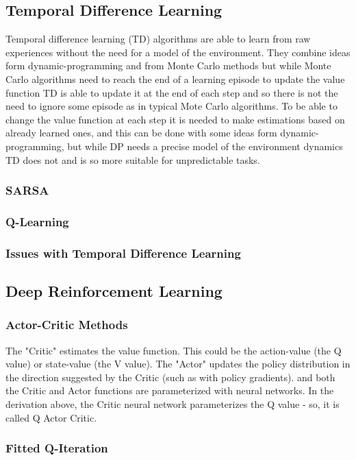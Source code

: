 \subsection{Temporal Difference Learning}
Temporal difference learning (TD) \cite{irl} algorithms are able to learn from raw experiences without the need for a model of the environment. They combine ideas form dynamic-programming and from Monte Carlo methods but while Monte Carlo algorithms need to reach the end of a learning episode to update the value function TD is able to update it at the end of each step and so there is not the need to ignore some episode as in typical Mote Carlo algorithms.
To be able to change the value function at each step it is needed to make estimations based on already learned ones, and this can be done with some ideas form dynamic-programming, but while DP needs a precise model of the environment dynamics TD does not and is so more suitable for unpredictable tasks.
\subsubsection{SARSA}

\subsubsection{Q-Learning}
\subsubsection{Issues with Temporal Difference Learning}
\subsection{Deep Reinforcement Learning}

\subsubsection{Actor-Critic Methods}
The "Critic" estimates the value function. This could be the action-value (the Q value) or state-value (the V value).
The "Actor" updates the policy distribution in the direction suggested by the Critic (such as with policy gradients).
and both the Critic and Actor functions are parameterized with neural networks. In the derivation above, the Critic neural network parameterizes the Q value - so, it is called Q Actor Critic.
\subsubsection{Fitted Q-Iteration}

